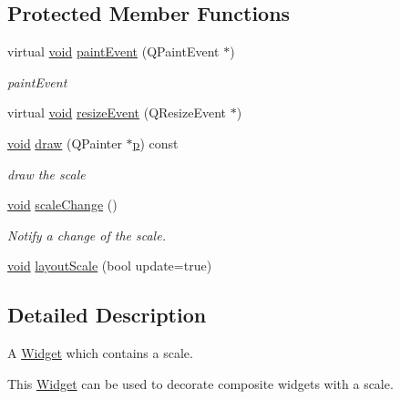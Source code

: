 \subsection*{Protected Member Functions}
\begin{DoxyCompactItemize}
\item 
virtual \hyperlink{group___u_a_v_objects_plugin_ga444cf2ff3f0ecbe028adce838d373f5c}{void} \hyperlink{class_qwt_scale_widget_ab3d4d32fb92fbef360841f74d469f2a9}{paint\-Event} (Q\-Paint\-Event $\ast$)
\begin{DoxyCompactList}\small\item\em paint\-Event \end{DoxyCompactList}\item 
virtual \hyperlink{group___u_a_v_objects_plugin_ga444cf2ff3f0ecbe028adce838d373f5c}{void} \hyperlink{class_qwt_scale_widget_a9072385d42de47fec634989134d1cd98}{resize\-Event} (Q\-Resize\-Event $\ast$)
\item 
\hyperlink{group___u_a_v_objects_plugin_ga444cf2ff3f0ecbe028adce838d373f5c}{void} \hyperlink{class_qwt_scale_widget_aab7267f2a3137b94a508a655bfaf4fd4}{draw} (Q\-Painter $\ast$\hyperlink{glext_8h_aa5367c14d90f462230c2611b81b41d23}{p}) const 
\begin{DoxyCompactList}\small\item\em draw the scale \end{DoxyCompactList}\item 
\hyperlink{group___u_a_v_objects_plugin_ga444cf2ff3f0ecbe028adce838d373f5c}{void} \hyperlink{class_qwt_scale_widget_af151a963ea3cb7f04815db93e8f4882d}{scale\-Change} ()
\begin{DoxyCompactList}\small\item\em Notify a change of the scale. \end{DoxyCompactList}\item 
\hyperlink{group___u_a_v_objects_plugin_ga444cf2ff3f0ecbe028adce838d373f5c}{void} \hyperlink{class_qwt_scale_widget_a5964a55d1572ea775eae3ca93a755358}{layout\-Scale} (bool update=true)
\end{DoxyCompactItemize}


\subsection{Detailed Description}
A \hyperlink{class_widget}{Widget} which contains a scale. 

This \hyperlink{class_widget}{Widget} can be used to decorate composite widgets with a scale. 

